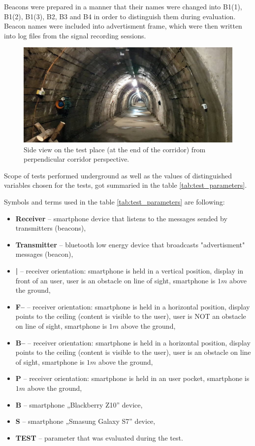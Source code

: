 \documentclass[../main.tex]{subfiles}
\begin{document}
Beacons were prepared in a manner that their names were changed into B1(1), B1(2), B1(3), B2, B3 and B4 in order to distinguish them during evaluation. Beacon names were included into advertisment frame, which were then written into log files from the signal recording sessions.

\begin{figure}[ht]
\includegraphics[width=\textwidth, keepaspectratio]{pictures/tests_corridor_general.pdf}
\centering
\caption{Side view on the test place (at the end of the corridor) from perpendicular corridor perspective.}
\label{fig:tests_corridor_genera}
\end{figure}


Scope of tests performed underground as well as the values of distinguished variables chosen for the tests, got summaried in the table \ref{tab:test_parameters}.

Symbols and terms used in the table \ref{tab:test_parameters} are following:
\begin{itemize}
	\item \textbf{Receiver} -- smartphone device that listens to the messages sended by transmitters (beacons),
	\item \textbf{Transmitter} -- bluetooth low energy device that broadcasts "advertisment" messages (beacon),
	\item \textbf{|} -- receiver orientation: smartphone is held in a vertical position, display in front of an user, user is an obstacle on line of sight, smartphone is $1m$ above the ground,
	\item \textbf{F--} --	receiver orientation: smartphone is held in a horizontal position, display points to the ceiling (content is visible to the user), user is NOT an obstacle on line of sight, smartphone is $1m$ above the ground,
	\item \textbf{B--} --	receiver orientation: smartphone is held in a horizontal position, display points to the ceiling (content is visible to the user), user is an obstacle on line of sight, smartphone is $1m$ above the ground,
	\item \textbf{P}	-- receiver orientation: smartphone is held in an user pocket, smartphone is $1m$ above the ground,
	\item \textbf{B}	-- smartphone „Blackberry Z10” device,
	\item \textbf{S}	-- smartphone „Smasung Galaxy S7” device,
	\item \textbf{TEST} -- parameter that was evaluated during the test.
\end{itemize}
\end{document}
